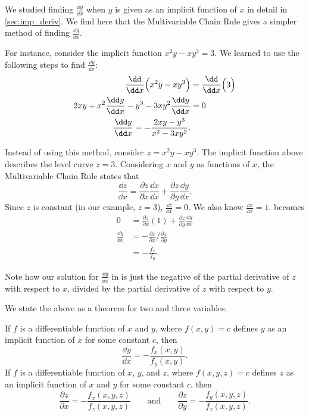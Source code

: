 We studied finding $\frac{\dd y}{\dd x}$ when $y$ is given as an implicit function of $x$ in detail in \autoref{sec:imp_deriv}. We find here that the Multivariable Chain Rule gives a simpler method of finding $\frac{\dd y}{\dd x}$.

For instance, consider the implicit function $x^2y-xy^3=3.$ We learned to use the following steps to find $\frac{\dd y}{\dd x}$:
\begin{align}
\frac{\dd}{\dd x}\Bigl(x^2y-xy^3\Bigr) &= \frac{\dd}{\dd x}\Bigl(3\Bigr) \notag\\
2xy + x^2\frac{\dd y}{\dd x}-y^3-3xy^2\frac{\dd y}{\dd x} &= 0\notag \\
\frac{\dd y}{\dd x} = -\frac{2xy-y^3}{x^2-3xy^2}.\label{eq:mchain2}
\end{align}

Instead of using this method, consider $z=x^2y-xy^3$. The implicit function above describes the level curve $z=3$. Considering $x$ and $y$ as functions of $x$, the Multivariable Chain Rule states that
\begin{equation}\frac{\dd z}{\dd x} = \frac{\partial z}{\partial x}\frac{\dd x}{\dd x}+\frac{\partial z}{\partial y}\frac{\dd y}{\dd x}.\label{eq:mchain1}\end{equation}
Since $z$ is constant (in our example, $z=3$), $\frac{\dd z}{\dd x} = 0$. We also know $\frac{\dd x}{\dd x} = 1$.  becomes
\begin{align*}
0 &= \frac{\partial z}{\partial x}(1) + \frac{\partial z}{\partial y}\frac{\dd y}{\dd x} %
\\[5pt]
\frac{\dd y}{\dd x} &= -\frac{\partial z}{\partial x}\Big/\frac{\partial z}{\partial y}\\[5pt]
			&= -\frac{\,f_x\,}{f_y}.
\end{align*}

Note how our solution for $\frac{\dd y}{\dd x}$ in  is just the negative of the partial derivative of $z$ with respect to $x$, divided by the partial derivative of $z$ with respect to $y$.

We state the above as a theorem for two and three variables.

\begin{theorem}\label{thm:implicit_deriv_chain}
If $f$ is a differentiable function of $x$ and $y$, where $f(x,y)=c$ defines $y$ as  an implicit function of $x$ for some constant $c$, then
\[\frac{\dd y}{\dd x} = - \frac{f_x(x,y)}{f_y(x,y)}.\]
If $f$ is a differentiable function of $x$, $y$, and $z$, where $f(x,y,z)=c$ defines $z$ as an implicit function of $x$ and $y$ for some constant $c$, then
\[
\frac{\partial z}{\partial x}=-\frac{f_x(x,y,z)}{f_z(x,y,z)}
\qquad\text{and}\qquad
\frac{\partial z}{\partial y}=-\frac{f_y(x,y,z)}{f_z(x,y,z)}.
\]
\end{theorem}

